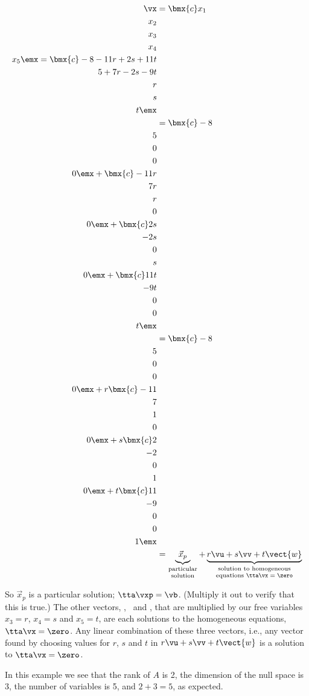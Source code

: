 {\begin{align*}
\vx &= \bmx{c}x_1\\x_2\\x_3\\x_4\\x_5\emx = \bmx{c}-8-11r+2s+11t\\5+7r-2s-9t\\r\\s\\t\emx\\
    &= \bmx{c}-8\\5\\0\\0\\0\emx + \bmx{c}-11r\\7r\\r\\0\\0\emx+ \bmx{c}2s\\-2s\\0\\s\\0\emx + \bmx{c}11t\\-9t\\0\\0\\t\emx \\
    &= \bmx{c}-8\\5\\0\\0\\0\emx + r\bmx{c}-11\\7\\1\\0\\0\emx+ s\bmx{c}2\\-2\\0\\1\\0\emx + t\bmx{c}11\\-9\\0\\0\\1\emx \\
    &= \underbrace{\vec{x}_p}_{\parbox{35pt}{\center \scriptsize {\vskip -10pt} particular solution}}+ \underbrace{r\vu+s\vv+t\vect{w}}_{\parbox{100pt}{\center \scriptsize {\vskip -10pt} solution to homogeneous equations $\tta\vx=\zero$}}
\end{align*}


So $\vec{x}_p$ is a particular solution; $\tta\vxp = \vb$. (Multiply it out to verify that this is true.) The other vectors, \vu, \vv\ and , that are multiplied by our free variables $x_3=r$, $x_4=s$ and $x_5=t$, are each solutions to the homogeneous equations, $\tta\vx=\zero$. Any linear combination of these three vectors, i.e., any vector found by choosing values for $r$, $s$ and $t$ in $r\vu+s\vv+t\vect{w}$ is a solution to $\tta\vx=\zero$.

In this example we see that the rank of $A$ is 2, the dimension of the null space is 3, the number of variables is 5, and $2+3=5$, as expected.}

